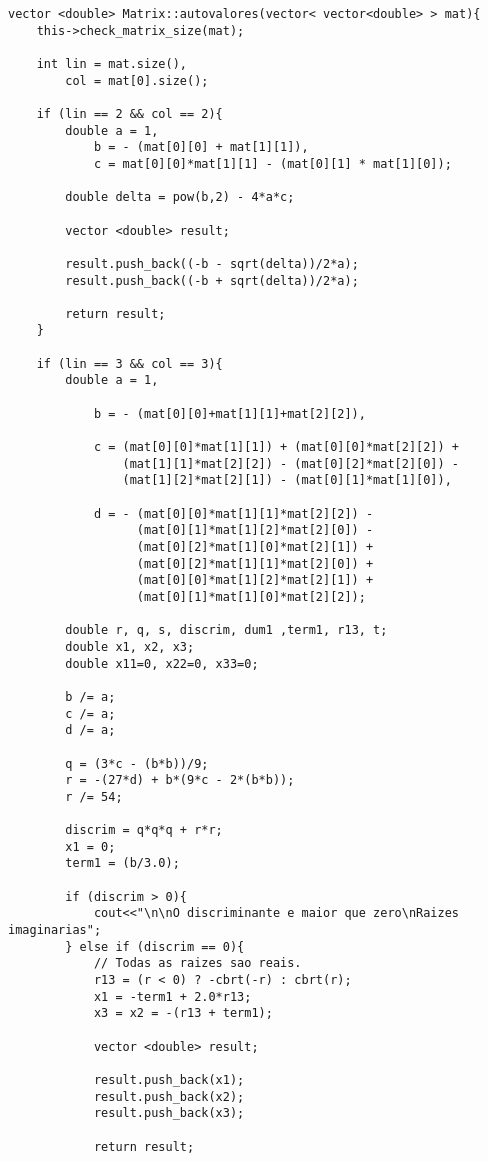 \documentclass[a4paper, 11pt]{article}
\begin{document}
\begin{lstlisting}
vector <double> Matrix::autovalores(vector< vector<double> > mat){
	this->check_matrix_size(mat);
	
	int lin = mat.size(), 
		col = mat[0].size();
	
	if (lin == 2 && col == 2){
		double a = 1,
			b = - (mat[0][0] + mat[1][1]),
			c = mat[0][0]*mat[1][1] - (mat[0][1] * mat[1][0]);
			
		double delta = pow(b,2) - 4*a*c;
		
		vector <double> result;
		
		result.push_back((-b - sqrt(delta))/2*a);
		result.push_back((-b + sqrt(delta))/2*a);
		
		return result;
	}

	if (lin == 3 && col == 3){
		double a = 1,
        
			b = - (mat[0][0]+mat[1][1]+mat[2][2]),
            
			c = (mat[0][0]*mat[1][1]) + (mat[0][0]*mat[2][2]) + 
            	(mat[1][1]*mat[2][2]) - (mat[0][2]*mat[2][0]) - 
                (mat[1][2]*mat[2][1]) - (mat[0][1]*mat[1][0]),
                
			d = - (mat[0][0]*mat[1][1]*mat[2][2]) - 
                  (mat[0][1]*mat[1][2]*mat[2][0]) - 
                  (mat[0][2]*mat[1][0]*mat[2][1]) + 
                  (mat[0][2]*mat[1][1]*mat[2][0]) + 
                  (mat[0][0]*mat[1][2]*mat[2][1]) + 
                  (mat[0][1]*mat[1][0]*mat[2][2]);
			
		double r, q, s, discrim, dum1 ,term1, r13, t; 
	    double x1, x2, x3; 
	    double x11=0, x22=0, x33=0; 
		
		b /= a; 
	    c /= a; 
	    d /= a; 
	     
	    q = (3*c - (b*b))/9; 
	    r = -(27*d) + b*(9*c - 2*(b*b)); 
	    r /= 54; 
	      
	    discrim = q*q*q + r*r; 
	    x1 = 0;
	    term1 = (b/3.0); 
		
		if (discrim > 0){ 
	    	cout<<"\n\nO discriminante e maior que zero\nRaizes imaginarias"; 
		} else if (discrim == 0){ 
		   	// Todas as raizes sao reais. 
	       	r13 = (r < 0) ? -cbrt(-r) : cbrt(r); 
	       	x1 = -term1 + 2.0*r13; 
	       	x3 = x2 = -(r13 + term1); 
			
			vector <double> result;

			result.push_back(x1);
			result.push_back(x2);
			result.push_back(x3);
		
			return result;			         
			

\end{lstlisting}
\end{document}
